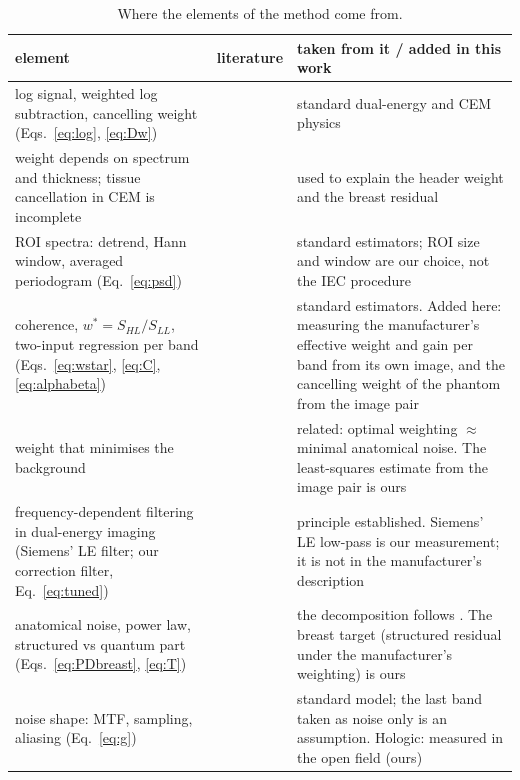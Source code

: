 \documentclass[11pt,a4paper]{article}
\newcommand{\ws}{w^{*}}
\begin{document}
\begin{table}[H]\centering\footnotesize
\caption{Where the elements of the method come from.}\label{tab:lit}
\begin{tabular}{p{4.2cm}p{3.5cm}p{7.2cm}}
\toprule
element & literature & taken from it / added in this work \\
\midrule
log signal, weighted log subtraction, cancelling weight (Eqs.~\ref{eq:log}, \ref{eq:Dw}) & \cite{alvarez1976,lehmann1981,johns1985,johns1987,lewin2003,korporaal2018} & standard dual-energy and CEM physics \\
weight depends on spectrum and thickness; tissue cancellation in CEM is incomplete & \cite{carton2010,hu2017,hill2013b,knogler2016} & used to explain the header weight and the breast residual \\
ROI spectra: detrend, Hann window, averaged periodogram (Eq.~\ref{eq:psd}) & \cite{welch1967,carter1973,harris1978,zhou2011,dobbins2006,iec62220} & standard estimators; ROI size and window are our choice, not the IEC procedure \\
coherence, $\ws=S_{HL}/S_{LL}$, two-input regression per band (Eqs.~\ref{eq:wstar}, \ref{eq:C}, \ref{eq:alphabeta}) & \cite{bendat2010,carter1973} & standard estimators. Added here: measuring the manufacturer's effective weight and gain per band from its own image, and the cancelling weight of the phantom from the image pair \\
weight that minimises the background & \cite{fredenberg2010} & related: optimal weighting $\approx$ minimal anatomical noise. The least-squares estimate from the image pair is ours \\
frequency-dependent filtering in dual-energy imaging (Siemens' LE filter; our correction filter, Eq.~\ref{eq:tuned}) & \cite{macovski1983,cao1988,mccollough1989,johns1985,warp2003,richard2008,allec2013} & principle established. Siemens' LE low-pass is our measurement; it is not in the manufacturer's description \cite{korporaal2018,knogler2016} \\
anatomical noise, power law, structured vs quantum part (Eqs.~\ref{eq:PDbreast}, \ref{eq:T}) & \cite{burgess2001,heine2002,bochud1999,richard2005,hill2013a,hill2013b,mainprize2012} & the decomposition follows \cite{hill2013a}. The breast target (structured residual under the manufacturer's weighting) is ours \\
noise shape: MTF, sampling, aliasing (Eq.~\ref{eq:g}) & \cite{dobbins1995,albert2000,cunningham2000,zhao1997,zhao2003,nhsbsp} & standard model; the last band taken as noise only is an assumption. Hologic: measured in the open field (ours) \\

\end{tabular}
\end{table}
\end{document}
